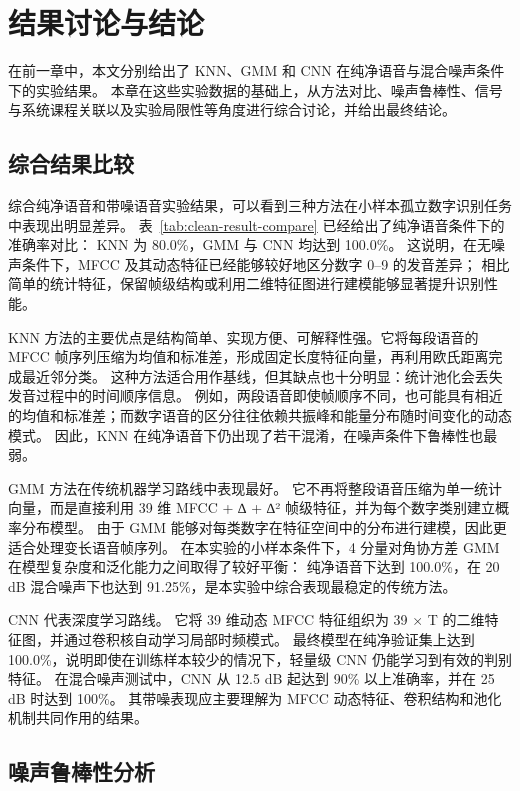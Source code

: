 \section{结果讨论与结论}

在前一章中，本文分别给出了 KNN、GMM 和 CNN 在纯净语音与混合噪声条件下的实验结果。
本章在这些实验数据的基础上，从方法对比、噪声鲁棒性、信号与系统课程关联以及实验局限性等角度进行综合讨论，并给出最终结论。

\subsection{综合结果比较}

综合纯净语音和带噪语音实验结果，可以看到三种方法在小样本孤立数字识别任务中表现出明显差异。
表~\ref{tab:clean-result-compare} 已经给出了纯净语音条件下的准确率对比：
KNN 为 80.0\%，GMM 与 CNN 均达到 100.0\%。
这说明，在无噪声条件下，MFCC 及其动态特征已经能够较好地区分数字 0–9 的发音差异；
相比简单的统计特征，保留帧级结构或利用二维特征图进行建模能够显著提升识别性能。

KNN 方法的主要优点是结构简单、实现方便、可解释性强。它将每段语音的 MFCC
帧序列压缩为均值和标准差，形成固定长度特征向量，再利用欧氏距离完成最近邻分类。
这种方法适合用作基线，但其缺点也十分明显：统计池化会丢失发音过程中的时间顺序信息。
例如，两段语音即使帧顺序不同，也可能具有相近的均值和标准差；而数字语音的区分往往依赖共振峰和能量分布随时间变化的动态模式。
因此，KNN 在纯净语音下仍出现了若干混淆，在噪声条件下鲁棒性也最弱。

GMM 方法在传统机器学习路线中表现最好。
它不再将整段语音压缩为单一统计向量，而是直接利用 39 维 MFCC + ∆ + ∆² 帧级特征，并为每个数字类别建立概率分布模型。
由于 GMM 能够对每类数字在特征空间中的分布进行建模，因此更适合处理变长语音帧序列。
在本实验的小样本条件下，4 分量对角协方差 GMM 在模型复杂度和泛化能力之间取得了较好平衡：
纯净语音下达到 100.0\%，在 20 dB 混合噪声下也达到 91.25\%，是本实验中综合表现最稳定的传统方法。

CNN 代表深度学习路线。
它将 39 维动态 MFCC 特征组织为 39 × T 的二维特征图，并通过卷积核自动学习局部时频模式。
最终模型在纯净验证集上达到 100.0\%，说明即使在训练样本较少的情况下，轻量级 CNN 仍能学习到有效的判别特征。
在混合噪声测试中，CNN 从 12.5 dB 起达到 90\% 以上准确率，并在 25 dB 时达到 100\%。
其带噪表现应主要理解为 MFCC 动态特征、卷积结构和池化机制共同作用的结果。

\subsection{噪声鲁棒性分析}

